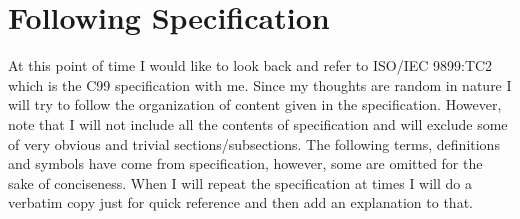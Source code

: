 \chapter{Following Specification}
\startcolumns[n=3,distance=2em]
  \placelist
    [section]
    [alternative=c, %
     interaction=all,]
\stopcolumns


At this point of time I would like to look back and refer to ISO/IEC
9899:TC2 which is the C99 specification with me. Since my thoughts are
random in nature I will try to follow the organization of content
given in the specification. However, note that I will not include all
the contents of specification and will exclude some of very obvious
and trivial sections/subsections. The following terms, definitions and
symbols have come from specification, however, some are omitted for
the sake of conciseness. When I will repeat the specification at times I will
do a verbatim copy just for quick reference and then add an
explanation to that.

